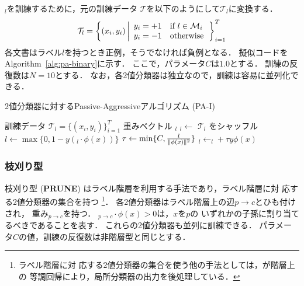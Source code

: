 \documentclass[japanese]{jnlp_1.4}
\newcommand{\vect}[1]{}
\begin{document}
$\vect{w}_l$を訓練するために，元の訓練データ
$\mathcal{T}$を以下のようにして$\mathcal{T}_l$に変換する．
\[
\mathcal{T}_l = \left\{ ( x_i, y_i ) \left|
\begin{array}{l@{\hspace{0em}}l}
y_i = +1 &\quad  \mbox{if $l \in \mathcal{M}_i$} \\
y_i = -1 &\quad \mbox{otherwise}
\end{array}
\right. \right\}_{i=1}^T 
\]
各文書はラベル$l$を持つとき正例，そうでなければ負例となる．
擬似コードを Algorithm~\ref{alg:pa-binary}に示す．
ここで，パラメータ$C$は$1.0$とする．
訓練の反復数は$N=10$とする．
なお，各2値分類器は独立なので，訓練は容易に並列化できる．

\begin{algorithm}[t]
\caption{
2値分類器に対するPassive-Aggressiveアルゴリズム (PA-I)}
\label{alg:pa-binary}
\DeclarePairedDelimiter\norm{\lVert}{\rVert}
\renewcommand{\algorithmicrequire}{}
\renewcommand{\algorithmicensure}{}
\setlength{\baselineskip}{11pt}
\begin{algorithmic}[1]
\REQUIRE 訓練データ $\mathcal{T}_l = \{ ( x_i, y_i ) \}_{i=1}^T$
\ENSURE 重みベクトル $\vect{w}_l$
\STATE $\vect{w}_l \leftarrow \vect{0}$
  \STATE $\mathcal{T}_l$ をシャッフル
    \STATE $l \leftarrow \max \{ 0, 1 - y (\vect{w}_{l} \cdot \phi(x)) \}$
        \STATE $\tau \leftarrow \min \{ C, \frac{l}{\norm{\phi(x)}^2} \}$
        \STATE $\vect{w}_l \leftarrow \vect{w}_l + \tau y \phi(x)$
    \ENDIF
  \ENDFOR
\ENDFOR
\end{algorithmic}
\end{algorithm}


\subsubsection{枝刈り型}
\label{sec:experiments-model-ls}

枝刈り型 ({\bf PRUNE}) はラベル階層を利用する手法であり，ラベル階層に対
応する2値分類器の集合を持つ
\cite{Montejo2006,Wang2011IJCNLPfull,Sasaki2012}\footnote{ラベル階層に対
応する2値分類器の集合を使う他の手法としては，\cite{Punera2008}が階層上の
等調回帰により，局所分類器の出力を後処理している．}．
各2値分類器はラベル階層上の辺$p \rightarrow c$とひも付けされ，
重み$\vect{w}_{p \rightarrow c}$を持つ．
$\vect{w}_{p \rightarrow c} \cdot \phi(x) > 0$は，$x$を$p$の
いずれかの子孫に割り当てるべきであることを表す．
これらの2値分類器も並列に訓練できる．
パラメータ$C$の値，訓練の反復数は非階層型と同じとする．
\end{document}

